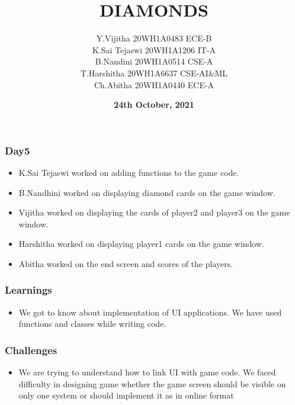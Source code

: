 \documentclass[12pt]{beamer}
\title{\textbf{DIAMONDS}}
\author[Bvrith]{Y.Vijitha 20WH1A0483 ECE-B\\K.Sai Tejaswi 20WH1A1206 IT-A\\ B.Nandini 20WH1A0514 CSE-A\\ T.Harshitha 20WH1A6637 CSE-AI&ML\\ Ch.Abitha 20WH1A0440 ECE-A}
\date{\textbf{24th October, 2021}}
\begin{document}
    \begin{frame}
        \titlepage
    \end{frame}
	    \begin{frame}
	\frametitle{Day5}
	\begin{itemize}
	    \item K.Sai Tejaswi worked on adding functions to the game code.
	    \item B.Nandhini worked on displaying diamond cards on the game window.
	    \item Vijitha worked on displaying the cards of player2 and player3 on the game window.
	    \item Harshitha worked on displaying player1 cards on the game window.
	    \item Abitha worked on the end screen and scores of the players.
	    \end{itemize}
	    \end{frame}
    \begin{frame}
        \frametitle{Learnings}
	\begin{itemize}
	    \item We got to know about implementation of UI applications. We have used functions and classes while writing code. 
	\end{itemize}
    \end{frame}
    \begin{frame}
	\frametitle{Challenges}
        \begin{itemize}
	    \item We are trying to understand how to link UI with game code. We faced difficulty in designing game whether the game screen should be visible on only one system or should implement it as in online format
        \end{itemize}
    \end{frame}
\end{document}
